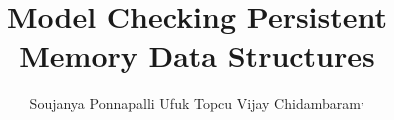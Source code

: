 \documentclass[sigplan,10pt,screen]{acmart}
\date{}
\begin{document}

\title{Model Checking Persistent Memory Data Structures}

\author{
  {\rm Soujanya Ponnapalli\affmark[1]}
  \enspace 
  {\rm Ufuk Topcu\affmark[1]}
  \enspace
  {\rm Vijay Chidambaram\affmark[1]$^,$\affmark[2]}
  \enspace
  \vspace{0.5em} \\
  \hspace{10pt}
  \hspace{10pt}
} %


\maketitle

\clearpage



\end{document}
